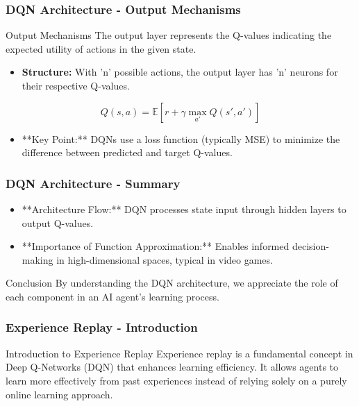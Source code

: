 \documentclass[aspectratio=169]{beamer}
\begin{document}
\begin{frame}[fragile]
    \frametitle{DQN Architecture - Output Mechanisms}
    \begin{block}{Output Mechanisms}
        The output layer represents the Q-values indicating the expected utility of actions in the given state.
    \end{block}
    \begin{itemize}
        \item \textbf{Structure:} With 'n' possible actions, the output layer has 'n' neurons for their respective Q-values.
    \end{itemize}
    \begin{equation}
        Q(s, a) = \mathbb{E}[r + \gamma \max_{a'} Q(s', a')]
    \end{equation}
    \begin{itemize}
        \item **Key Point:** DQNs use a loss function (typically MSE) to minimize the difference between predicted and target Q-values.
    \end{itemize}
\end{frame}

\begin{frame}[fragile]
    \frametitle{DQN Architecture - Summary}
    \begin{itemize}
        \item **Architecture Flow:** DQN processes state input through hidden layers to output Q-values.
        \item **Importance of Function Approximation:** Enables informed decision-making in high-dimensional spaces, typical in video games.
    \end{itemize}
    \begin{block}{Conclusion}
        By understanding the DQN architecture, we appreciate the role of each component in an AI agent's learning process.
    \end{block}
\end{frame}

\begin{frame}[fragile]
    \frametitle{Experience Replay - Introduction}
    \begin{block}{Introduction to Experience Replay}
        Experience replay is a fundamental concept in Deep Q-Networks (DQN) that enhances learning efficiency. 
        It allows agents to learn more effectively from past experiences instead of relying solely on a purely online learning approach.
    \end{block}
\end{frame}
\end{document}
